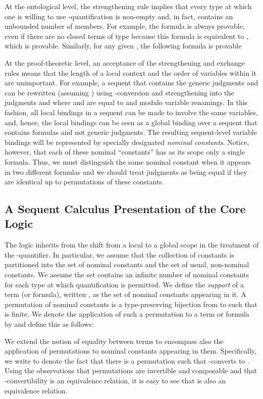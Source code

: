 At the ontological level, the strengthening rule implies that every
type at which one is
willing to use -quantification is non-empty and, in fact,
contains an unbounded number of members.  For example, the formula
 is always provable, even if there are no closed
terms of type  because this formula is equivalent to
, which is provable.
Similarly, for any given , the following formula
is provable


At the proof-theoretic level, an acceptance of the strengthening and
exchange rules means
that the length of a local context and the order of variables within
it are unimportant.  For example, a sequent that contains the generic
judgments   and
 can be rewritten (assuming  )
using
-conversion and strengthening into the judgments
   and
 where  and  are
equal to  and  modulo variable renamings.  In this fashion, all
local bindings in a sequent can be made to involve the same
variables, and, hence, the local bindings can be seen as a global
binding over a sequent that contains formulas and not generic
judgments.  The resulting sequent-level variable bindings will be represented by
specially designated {\it nominal constants}.
Notice, however, that each of these nominal ``constants'' has as its scope only a single
formula.  Thus, we must distinguish the same nominal constant when it
appears in two different formulas and we should treat judgments
as being equal if they are identical up to permutations of these
constants.


\subsection{A Sequent Calculus Presentation of the Core Logic}

The logic \logic inherits from \LG the shift from a local to a global
scope in the treatment of the -quantifier.  In particular,
we assume that the collection of constants is partitioned into the set
 of nominal constants and the set  of
usual, non-nominal constants.
We assume the set  contains an infinite number of nominal
constants for each type at which  quantification is permitted.
We define the {\it support} of a term (or
formula), written , as the set of nominal constants
appearing in it.
A permutation of nominal constants is a type-preserving bijection  from
 to  such that  is
finite.  We denote the application of such a
permutation to a term or formula  by  and define this as
follows:

We extend the notion of equality between terms to encompass also
the application of permutations to nominal constants appearing in
them. Specifically, we write  to denote the fact that
there is a permutation  such that  -converts to
. Using the observations that permutations are invertible and
composable and that -convertibility is an equivalence
relation, it is easy to see that  is also an equivalence
relation.

